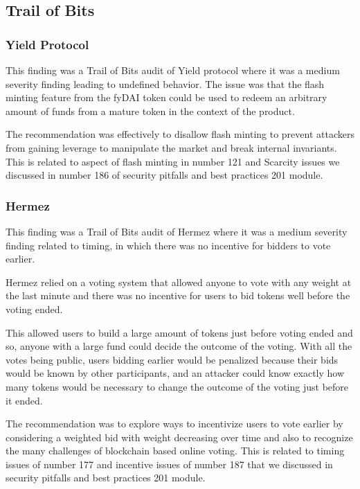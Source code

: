 \subsection{Trail of Bits}\label{trail-of-bits}

\subsubsection{Yield Protocol}\label{yield-protocol}

This finding was a Trail of Bits audit of Yield protocol where it was a
medium severity finding leading to undefined behavior. The issue was
that the flash minting feature from the fyDAI token could be used to
redeem an arbitrary amount of funds from a mature token in the context
of the product.

The recommendation was effectively to disallow flash minting to prevent
attackers from gaining leverage to manipulate the market and break
internal invariants. This is related to aspect of flash minting in
number 121 and Scarcity issues we discussed in number 186 of security
pitfalls and best practices 201 module.

\subsubsection{Hermez}\label{hermez}

This finding was a Trail of Bits audit of Hermez where it was a medium
severity finding related to timing, in which there was no incentive for
bidders to vote earlier.

Hermez relied on a voting system that allowed anyone to vote with any
weight at the last minute and there was no incentive for users to bid
tokens well before the voting ended.

This allowed users to build a large amount of tokens just before voting
ended and so, anyone with a large fund could decide the outcome of the
voting. With all the votes being public, users bidding earlier would be
penalized because their bids would be known by other participants, and
an attacker could know exactly how many tokens would be necessary to
change the outcome of the voting just before it ended.

The recommendation was to explore ways to incentivize users to vote
earlier by considering a weighted bid with weight decreasing over time
and also to recognize the many challenges of blockchain based online
voting. This is related to timing issues of number 177 and incentive
issues of number 187 that we discussed in security pitfalls and best
practices 201 module.

